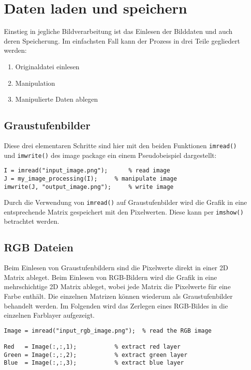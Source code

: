 \section{Daten laden und speichern}
Einstieg in jegliche Bildverarbeitung ist das Einlesen der Bilddaten und
auch deren Speicherung. Im einfachsten Fall kann der Prozess in drei Teile
gegliedert werden:

\begin{enumerate}
	\item Originaldatei einlesen
	\item Manipulation
	\item Manipulierte Daten ablegen
\end{enumerate}

\subsection{Graustufenbilder}
Diese drei elementaren Schritte sind hier mit den beiden Funktionen 
\lstinline{imread()} und \lstinline{imwrite()} des image package ein
einem Pseudobeispiel dargestellt:

\begin{lstlisting}
I = imread("input_image.png");		% read image
J = my_image_processing(I);		% manipulate image
imwrite(J, "output_image.png");		% write image
\end{lstlisting}

Durch die Verwendung von \lstinline{imread()} auf Graustufenbilder wird
die Grafik in eine entsprechende Matrix gespeichert mit den Pixelwerten.
Diese kann per \lstinline{imshow()} betrachtet werden.

\subsection{RGB Dateien}
Beim Einlesen von Graustufenbildern sind die Pixelwerte direkt in einer
2D Matrix ableget. Beim Einlesen von RGB-Bildern wird die Grafik in eine
mehrschichtige 2D Matrix ableget, wobei jede Matrix die Pixelwerte für
eine Farbe enthält. Die einzelnen Matrizen können wiederum als
Graustufenbilder behandelt werden. Im Folgenden wird das Zerlegen eines
RGB-Bildes in die einzelnen Farblayer aufgezeigt.

\begin{lstlisting}
Image = imread("input_rgb_image.png");	% read the RGB image

Red   = Image(:,:,1);			% extract red layer
Green = Image(:,:,2);			% extract green layer
Blue  = Image(:,:,3);			% extract blue layer
\end{lstlisting}
